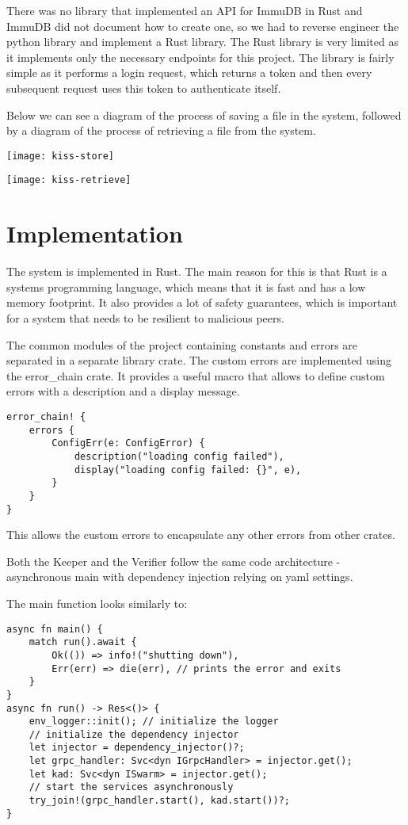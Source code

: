\documentclass[ twoside,openright,titlepage,numbers=noenddot,headinclude,%
                footinclude=true,cleardoublepage=empty,abstractoff, %
                BCOR=5mm,paper=a4,fontsize=11pt,%
                ngerman,american,%
                ]{scrreprt}
\begin{document}
There was no library that implemented an API for ImmuDB in Rust and ImmuDB did not document how to create one,
so we had to reverse engineer the python library and implement a Rust library.
The Rust library is very limited as it implements only the necessary endpoints for this project.
The library is fairly simple as it performs a login request, which returns a token and then every
subsequent request uses this token to authenticate itself.

Below we can see a diagram of the process of saving a file in the system,
followed by a diagram of the process of retrieving a file from the system.

\texttt{[image: kiss-store]}

\texttt{[image: kiss-retrieve]}


\section{Implementation}
\label{sec:implementation}

The system is implemented in Rust.
The main reason for this is that Rust is a systems programming language,
which means that it is fast and has a low memory footprint.
It also provides a lot of safety guarantees,
which is important for a system that needs to be resilient to malicious peers.

The common modules of the project containing constants and errors are separated in a separate library crate.
The custom errors are implemented using the error\_chain crate.
It provides a useful macro that allows to define custom errors with a description and a display message.
\begin{verbatim}
error_chain! {
    errors {
        ConfigErr(e: ConfigError) {
            description("loading config failed"),
            display("loading config failed: {}", e),
        }
    }
}
\end{verbatim}

This allows the custom errors to encapsulate any other errors from other crates.

Both the Keeper and the Verifier follow the same code architecture - asynchronous main with dependency injection
relying on yaml settings.

The main function looks similarly to:
\begin{verbatim}
async fn main() {
    match run().await {
        Ok(()) => info!("shutting down"),
        Err(err) => die(err), // prints the error and exits
    }
}
async fn run() -> Res<()> {
    env_logger::init(); // initialize the logger
    // initialize the dependency injector
    let injector = dependency_injector()?; 
    let grpc_handler: Svc<dyn IGrpcHandler> = injector.get();
    let kad: Svc<dyn ISwarm> = injector.get();
    // start the services asynchronously
    try_join!(grpc_handler.start(), kad.start())?;
}
\end{verbatim}
\end{document}
